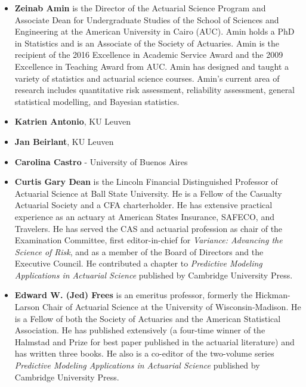 \documentclass[]{book}
\providecommand{\tightlist}{%
  \setlength{\itemsep}{0pt}\setlength{\parskip}{0pt}}
\theoremstyle{definition}
\theoremstyle{definition}
\theoremstyle{definition}
\theoremstyle{remark}
\begin{document}
\begin{itemize}
\item
  \textbf{Zeinab Amin} is the Director of the Actuarial Science Program
  and Associate Dean for Undergraduate Studies of the School of Sciences
  and Engineering at the American University in Cairo (AUC). Amin holds
  a PhD in Statistics and is an Associate of the Society of Actuaries.
  Amin is the recipient of the 2016 Excellence in Academic Service Award
  and the 2009 Excellence in Teaching Award from AUC. Amin has designed
  and taught a variety of statistics and actuarial science courses.
  Amin's current area of research includes quantitative risk assessment,
  reliability assessment, general statistical modelling, and Bayesian
  statistics.
\item
  \textbf{Katrien Antonio}, KU Leuven
\item
  \textbf{Jan Beirlant}, KU Leuven
\item
  \textbf{Carolina Castro} - University of Buenos Aires
\end{itemize}

\begin{itemize}
\tightlist
\item
  \textbf{Curtis Gary Dean} is the Lincoln Financial Distinguished
  Professor of Actuarial Science at Ball State University. He is a
  Fellow of the Casualty Actuarial Society and a CFA charterholder. He
  has extensive practical experience as an actuary at American States
  Insurance, SAFECO, and Travelers. He has served the CAS and actuarial
  profession as chair of the Examination Committee, first
  editor-in-chief for \emph{Variance: Advancing the Science of Risk},
  and as a member of the Board of Directors and the Executive Council.
  He contributed a chapter to \emph{Predictive Modeling Applications in
  Actuarial Science} published by Cambridge University Press.
\end{itemize}

\begin{itemize}
\tightlist
\item
  \textbf{Edward W. (Jed) Frees} is an emeritus professor, formerly the
  Hickman-Larson Chair of Actuarial Science at the University of
  Wisconsin-Madison. He is a Fellow of both the Society of Actuaries and
  the American Statistical Association. He has published extensively (a
  four-time winner of the Halmstad and Prize for best paper published in
  the actuarial literature) and has written three books. He also is a
  co-editor of the two-volume series \emph{Predictive Modeling
  Applications in Actuarial Science} published by Cambridge University
  Press.
\end{itemize}
\end{document}
